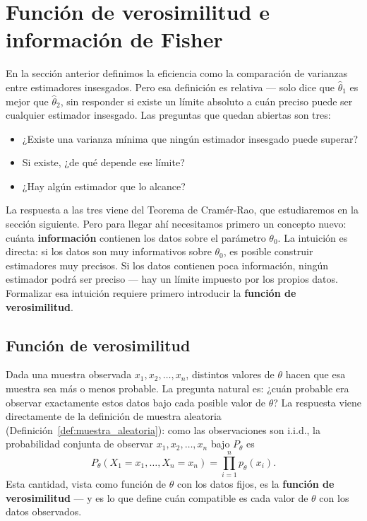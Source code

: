 \documentclass[12pt, a4paper]{book}
\numberwithin{equation}{chapter}
\begin{document}
\section{Funci\'{o}n de verosimilitud e informaci\'{o}n de
	Fisher}

En la secci\'{o}n anterior definimos la eficiencia como la
comparaci\'{o}n de varianzas entre estimadores insesgados.
Pero esa definici\'{o}n es relativa --- solo dice que
$\hat{\theta}_1$ es mejor que $\hat{\theta}_2$, sin
responder si existe un l\'{i}mite absoluto a cu\'{a}n
preciso puede ser cualquier estimador insesgado. Las
preguntas que quedan abiertas son tres:

\begin{itemize}[leftmargin=2em]
	\item ¿Existe una varianza m\'{i}nima que ning\'{u}n
	estimador insesgado puede superar?
	\item Si existe, ¿de qu\'{e} depende ese l\'{i}mite?
	\item ¿Hay alg\'{u}n estimador que lo alcance?
\end{itemize}

La respuesta a las tres viene del Teorema de Cram\'{e}r-Rao,
que estudiaremos en la secci\'{o}n siguiente. Pero para
llegar ah\'{i} necesitamos primero un concepto nuevo:
cu\'{a}nta \textbf{informaci\'{o}n} contienen los datos
sobre el par\'{a}metro $\theta_0$. La intuici\'{o}n es
directa: si los datos son muy informativos sobre $\theta_0$,
es posible construir estimadores muy precisos. Si los datos
contienen poca informaci\'{o}n, ning\'{u}n estimador
podr\'{a} ser preciso --- hay un l\'{i}mite impuesto por
los propios datos. Formalizar esa intuici\'{o}n requiere
primero introducir la \textbf{funci\'{o}n de verosimilitud}.

\subsection{Funci\'{o}n de verosimilitud}

Dada una muestra observada $x_1, x_2, \ldots, x_n$,
distintos valores de $\theta$ hacen que esa muestra sea
m\'{a}s o menos probable. La pregunta natural es: ¿cu\'{a}n
probable era observar exactamente estos datos bajo cada
posible valor de $\theta$? La respuesta viene directamente
de la definici\'{o}n de muestra aleatoria
(Definici\'{o}n~\ref{def:muestra_aleatoria}): como las
observaciones son i.i.d., la probabilidad conjunta de
observar $x_1, x_2, \ldots, x_n$ bajo $P_\theta$ es
\[
P_\theta(X_1 = x_1, \ldots, X_n = x_n)
= \prod_{i=1}^n p_\theta(x_i).
\]
Esta cantidad, vista como funci\'{o}n de $\theta$ con
los datos fijos, es la \textbf{funci\'{o}n de
	verosimilitud} --- y es lo que define cu\'{a}n compatible
es cada valor de $\theta$ con los datos observados.
\end{document}
